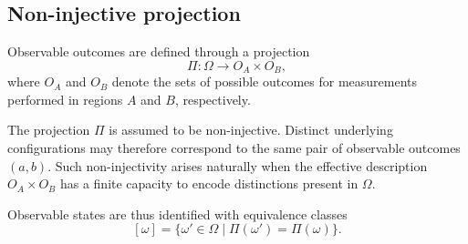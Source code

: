 \subsection{Non-injective projection}
  \label{subsec:non-injective-projection}

  Observable outcomes are defined through a projection
  \[
    \Pi : \Omega \rightarrow O_A \times O_B ,
  \]
  where $O_A$ and $O_B$ denote the sets of possible outcomes for measurements performed
  in regions $A$ and $B$, respectively.

  The projection $\Pi$ is assumed to be non-injective.
  Distinct underlying configurations may therefore correspond to the same pair of
  observable outcomes $(a,b)$.
  Such non-injectivity arises naturally when the effective description $O_A \times O_B$
  has a finite capacity to encode distinctions present in $\Omega$.

  Observable states are thus identified with equivalence classes
  \[
    [\omega] = \{ \omega' \in \Omega \mid \Pi(\omega') = \Pi(\omega) \}.
  \]
